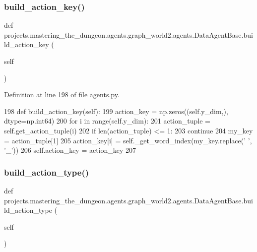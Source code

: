 \subsubsection{\texorpdfstring{build\+\_\+action\+\_\+key()}{build\_action\_key()}}
{\footnotesize\ttfamily def projects.\+mastering\+\_\+the\+\_\+dungeon.\+agents.\+graph\+\_\+world2.\+agents.\+Data\+Agent\+Base.\+build\+\_\+action\+\_\+key (\begin{DoxyParamCaption}\item[{}]{self }\end{DoxyParamCaption})}



Definition at line 198 of file agents.\+py.


\begin{DoxyCode}
198     \textcolor{keyword}{def }build\_action\_key(self):
199         action\_key = np.zeros((self.y\_dim,), dtype=np.int64)
200         \textcolor{keywordflow}{for} i \textcolor{keywordflow}{in} range(self.y\_dim):
201             action\_tuple = self.get\_action\_tuple(i)
202             \textcolor{keywordflow}{if} len(action\_tuple) <= 1:
203                 \textcolor{keywordflow}{continue}
204             my\_key = action\_tuple[1]
205             action\_key[i] = self.\_get\_word\_index(my\_key.replace(\textcolor{stringliteral}{' '}, \textcolor{stringliteral}{'\_'}))
206         self.action\_key = action\_key
207 
\end{DoxyCode}
\mbox{\label{classprojects_1_1mastering__the__dungeon_1_1agents_1_1graph__world2_1_1agents_1_1DataAgentBase_adbe7b4f659a2a39e8e6ec37bcd583d6f}} 
\subsubsection{\texorpdfstring{build\+\_\+action\+\_\+type()}{build\_action\_type()}}
{\footnotesize\ttfamily def projects.\+mastering\+\_\+the\+\_\+dungeon.\+agents.\+graph\+\_\+world2.\+agents.\+Data\+Agent\+Base.\+build\+\_\+action\+\_\+type (\begin{DoxyParamCaption}\item[{}]{self }\end{DoxyParamCaption})}



